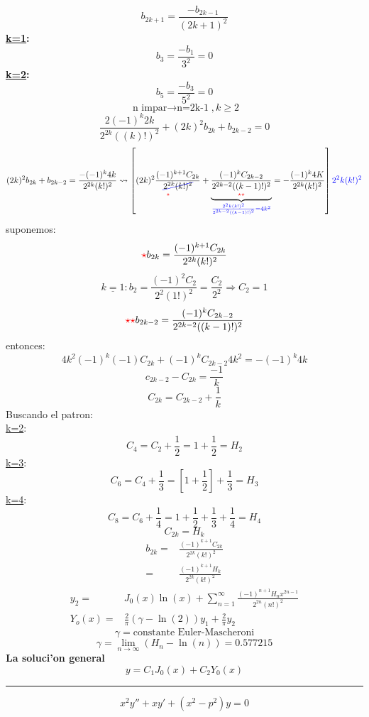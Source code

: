 \documentclass{article}
\theoremstyle{definition}
\begin{document}
\[b_{2k+1}=\frac{-b_{2k-1}}{(2k+1)^2}\]
\textbf{\underline{k=1}:}
\[b_3=\frac{-b_1}{3^2}=0\]
\textbf{\underline{k=2}:}
\[b_5=\frac{-b_3}{5^2}=0\]
\[\boxed{\text{n impar}\rightarrow \text{n=2k-1}}, k\geq 2\]
\[\frac{2(-1)^{k}2k}{2^{2k}((k)!)^2}+(2k)^2b_{2k}+b_{2k-2}=0\]
\[(2k)^2b_{2k}+b_{2k-2}=\frac{-(-1)^k4k}{2^{2k}(k!)^2}\rightsquigarrow \left[\underset{\textcolor{red}{\star}}{(2k)^2\frac{(-1)^{k+1}C_{2k}}{\textcolor{blue}{\cancel{\textcolor{black}{2^{2k}(k!)^2}}}}}+\underbrace{\underset{\textcolor{red}{\star\star}}{\frac{(-1)^kC_{2k-2}}{2^{2k-2}((k-1)!)^2}}}_{\textcolor{blue}{\frac{2^2k(k!)^2}{2^{2k-2}((k-1)!)^2}=4k^2}}=-\frac{(-1)^k4K}{2^{2k}(k!)^2}\right]\textcolor{blue}{2^2k(k!)^2}\]
suponemos:
\[\textcolor{red}{\star} b_{2k}=\frac{(-1)^{k+1}C_{2k}}{2^{2k}(k!)^2}\]
\[\underline{k=1}: b_2=\frac{(-1)^2C_2}{2^2(1!)^2}=\frac{C_2}{2^2}\Rightarrow C_2=1\]
\[\textcolor{red}{\star\star}b_{2k-2}=\frac{(-1)^kC_{2k-2}}{2^{2k-2}((k-1)!)^2}\]
entonces:
\[4k^2(-1)^k(-1)C_{2k}+(-1)^kC_{2k-2}4k^2=-(-1)^k4k\]
\[c_{2k-2}-C_{2k}=\frac{-1}{k}\]
\[C_{2k}=C_{2k-2}+\frac{1}{k}\]
Buscando el patron:\\
\underline{k=2}:
\[C_4=C_2+\frac{1}{2}=1+\frac{1}{2}=H_2\]
\underline{k=3}:
\[C_6=C_4+\frac{1}{3}=\left[1+\frac{1}{2}\right]+\frac{1}{3}=H_3\]
\underline{k=4}:
\[C_8=C_6+\frac{1}{4}=1+\frac{1}{2}+\frac{1}{3}+\frac{1}{4}=H_4\]
\[C_{2k}=H_k\]
\begin{align*}
	b_{2k}=&\frac{(-1)^{k+1}C_{2k}}{2^{2k}(k!)^2}\\
	=&\frac{(-1)^{k+1}H_k}{2^{2k}(k!)^2}
\end{align*}
\begin{align*}
	y_2=& J_0(x)\ln (x)+\sum\limits^{\infty}_{n=1}\frac{(-1)^{n+1}H_nx^{2n-1}}{2^{2n}(n!)^2}\\
	Y_o(x)=&\frac{2}{\pi}(\gamma -\ln (2))y_1+\frac{2}{\pi}y_2
\end{align*}
\[\gamma=\text{constante Euler-Mascheroni}\]
\[\gamma=\lim\limits_{n\to \infty}(H_n-\ln (n))=0.577215\]
\textbf{La soluci'on general}
\[y=C_1J_0(x)+C_2Y_0(x)\]
\par\noindent\rule{\textwidth}{0.5pt}
\[x^2y''+xy'+(x^2-p^2)y=0\]
\end{document}
